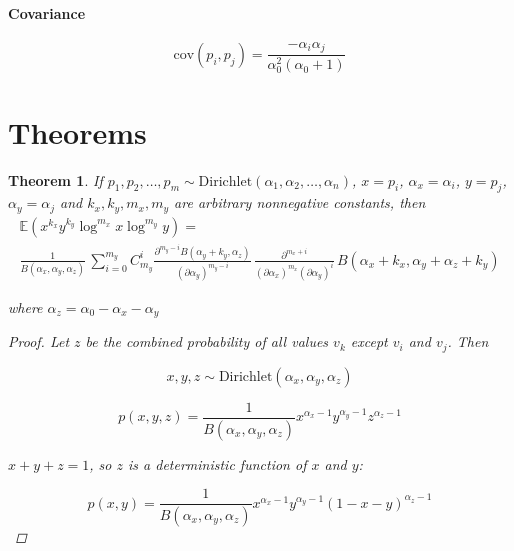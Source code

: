 \documentclass{article}
\begin{document}
\paragraph{Covariance}
\begin{equation}
\textrm{cov}(p_i, p_j) = \frac{-\alpha_i\alpha_j}{\alpha_0^2(\alpha_0 + 1)}
\end{equation}

\section{Theorems}

\newtheorem{theorem}{Theorem}
\begin{theorem}
If $p_1, p_2, \ldots, p_m \sim \textrm{Dirichlet}(\alpha_1, \alpha_2, \ldots, \alpha_n)$, $x = p_i$, $\alpha_x = \alpha_i$, $y = p_j$, $\alpha_y = \alpha_j$ and $k_x, k_y, m_x, m_y$ are arbitrary nonnegative constants, then 
\begin{multline}
\mathbb{E}(x^{k_x} y^{k_y} \log^{m_x} x \log^{m_y} y) = \\ \frac{1}{B(\alpha_x, \alpha_y, \alpha_z)} \,  \sum_{i=0}^{m_y}{ C^i_{m_y} \frac{\partial^{m_y-i} B(\alpha_y + k_y, \alpha_z)}{(\partial \alpha_y)^{m_y-i}} \, \frac{\partial^{m_x + i}}{(\partial \alpha_x)^{m_x} (\partial \alpha_y)^{i}} \, B(\alpha_x + k_x, \alpha_y + \alpha_z + k_y)}
\end{multline}

where $\alpha_z = \alpha_0 - \alpha_x - \alpha_y$
\begin{proof}
	Let $z$ be the combined probability of all values $v_k$ except $v_i$ and $v_j$. Then
	
	\begin{equation*}
	x, y, z \sim \textrm{Dirichlet}(\alpha_x, \alpha_y, \alpha_z)
	\end{equation*}
	
	\begin{equation}
	p(x, y, z) = \frac{1}{B(\alpha_x, \alpha_y, \alpha_z)} x^{\alpha_x - 1} y^{\alpha_y - 1} z^{\alpha_z - 1}
	\end{equation}
	
	
	$x + y + z = 1$, so $z$ is a deterministic function of $x$ and $y$: 
	
	\begin{equation}
	p(x, y) = \frac{1}{B(\alpha_x, \alpha_y, \alpha_z)} x^{\alpha_x - 1} y^{\alpha_y - 1} (1 - x - y)^{\alpha_z - 1}
	\end{equation}
	

\end{proof}
\end{theorem}
\end{document}
